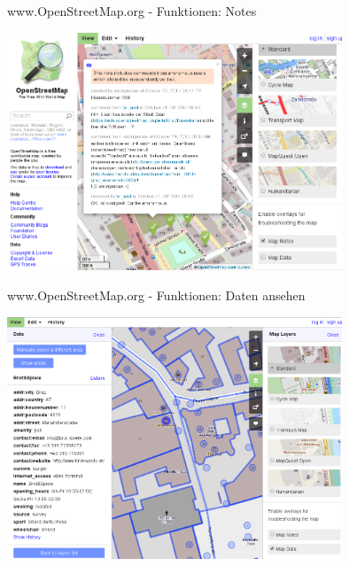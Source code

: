 \documentclass{beamer}
\begin{document}
\begin{frame}{ www.OpenStreetMap.org - Funktionen: Notes}

 \includegraphics[width=10cm]{mainpage-notes.png}

\end{frame}

\begin{frame}{ www.OpenStreetMap.org - Funktionen: Daten ansehen}

 \includegraphics[width=10cm]{mainpage-data.png}

\end{frame}
\end{document}
